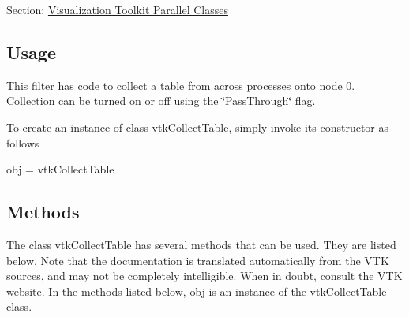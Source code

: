 Section\-: \hyperlink{sec_vtkparallel}{Visualization Toolkit Parallel Classes} \hypertarget{vtkwidgets_vtkxyplotwidget_Usage}{}\subsection{Usage}\label{vtkwidgets_vtkxyplotwidget_Usage}
This filter has code to collect a table from across processes onto node 0. Collection can be turned on or off using the \char`\"{}\-Pass\-Through\char`\"{} flag.

To create an instance of class vtk\-Collect\-Table, simply invoke its constructor as follows \begin{DoxyVerb}  obj = vtkCollectTable
\end{DoxyVerb}
 \hypertarget{vtkwidgets_vtkxyplotwidget_Methods}{}\subsection{Methods}\label{vtkwidgets_vtkxyplotwidget_Methods}
The class vtk\-Collect\-Table has several methods that can be used. They are listed below. Note that the documentation is translated automatically from the V\-T\-K sources, and may not be completely intelligible. When in doubt, consult the V\-T\-K website. In the methods listed below, {\ttfamily obj} is an instance of the vtk\-Collect\-Table class. 
